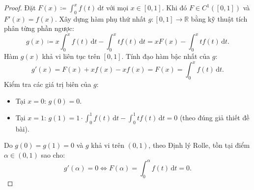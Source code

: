\documentclass{article}
\begin{document}
\begin{proof}
Đặt $F(x) \coloneqq \int_0^x f(t)\,\mathrm{d}t$ với mọi $x \in [0, 1]$. Khi đó $F \in C^1([0, 1])$ và $F'(x) = f(x)$.
Xây dựng hàm phụ thứ nhất $g: [0, 1] \to \mathbb{R}$ bằng kỹ thuật tích phân từng phần ngược:
\begin{equation}
    g(x) \coloneqq x \int_0^x f(t)\,\mathrm{d}t - \int_0^x t f(t)\,\mathrm{d}t = x F(x) - \int_0^x t f(t)\,\mathrm{d}t.
\end{equation}
Hàm $g(x)$ khả vi liên tục trên $[0, 1]$. Tính đạo hàm bậc nhất của $g$:
\begin{equation}
    g'(x) = F(x) + x f(x) - x f(x) = F(x) = \int_0^x f(t)\,\mathrm{d}t.
\end{equation}
Kiểm tra các giá trị biên của $g$:
\begin{itemize}
    \item Tại $x = 0$: $g(0) = 0$.
    \item Tại $x = 1$: $g(1) = 1 \cdot \int_0^1 f(t)\,\mathrm{d}t - \int_0^1 t f(t)\,\mathrm{d}t = 0$ (theo đúng giả thiết đề bài).
\end{itemize}
Do $g(0) = g(1) = 0$ và $g$ khả vi trên $(0, 1)$, theo Định lý Rolle, tồn tại điểm $\alpha \in (0, 1)$ sao cho:
\begin{equation}
    g'(\alpha) = 0 \iff F(\alpha) = \int_0^\alpha f(t)\,\mathrm{d}t = 0.
\end{equation}


\end{proof}
\end{document}
